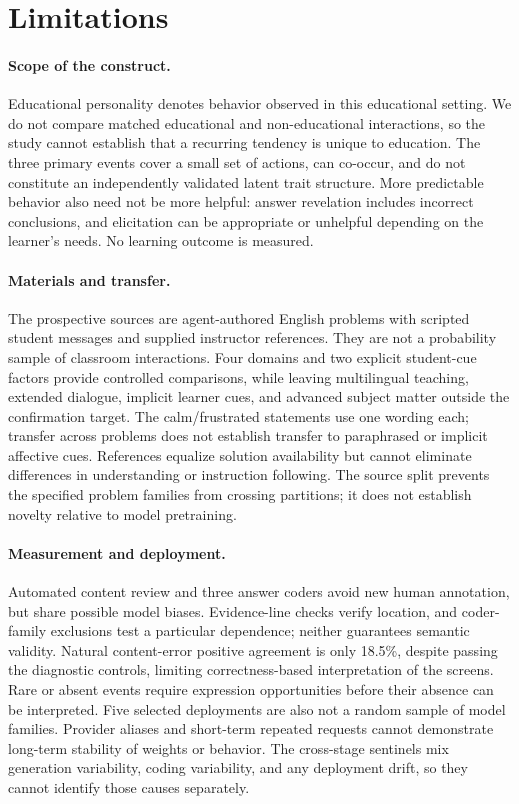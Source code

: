\section{Limitations}

\paragraph{Scope of the construct.}
Educational personality denotes behavior observed in this educational setting.
We do not compare matched educational and non-educational interactions, so the
study cannot establish that a recurring tendency is unique to education.
The three primary events cover a small set of actions, can co-occur, and do not
constitute an independently validated latent trait structure. More predictable
behavior also need not be more helpful: answer revelation includes incorrect
conclusions, and elicitation can be appropriate or unhelpful depending on the
learner's needs. No learning outcome is measured.

\paragraph{Materials and transfer.}
The prospective sources are agent-authored English problems with scripted
student messages and supplied instructor references. They are not a probability
sample of classroom interactions. Four domains and two explicit student-cue
factors provide controlled comparisons, while leaving multilingual teaching,
extended dialogue, implicit learner cues, and advanced subject matter outside
the confirmation target. The calm/frustrated statements use one wording each;
transfer across problems does not establish transfer to paraphrased or implicit
affective cues. References equalize solution availability but cannot
eliminate differences in understanding or instruction following. The source
split prevents the specified problem families from crossing partitions; it
does not establish novelty relative to model pretraining.

\paragraph{Measurement and deployment.}
Automated content review and three answer coders avoid new human annotation,
but share possible model biases. Evidence-line checks verify location, and
coder-family exclusions test a particular dependence; neither guarantees
semantic validity. Natural content-error positive agreement is only 18.5\%,
despite passing the diagnostic controls, limiting correctness-based
interpretation of the screens. Rare or absent events require expression opportunities
before their absence can be interpreted. Five selected deployments are also
not a random sample of model families. Provider aliases and short-term repeated
requests cannot demonstrate long-term stability of weights or behavior. The
cross-stage sentinels mix generation variability, coding variability, and any
deployment drift, so they cannot identify those causes separately.

